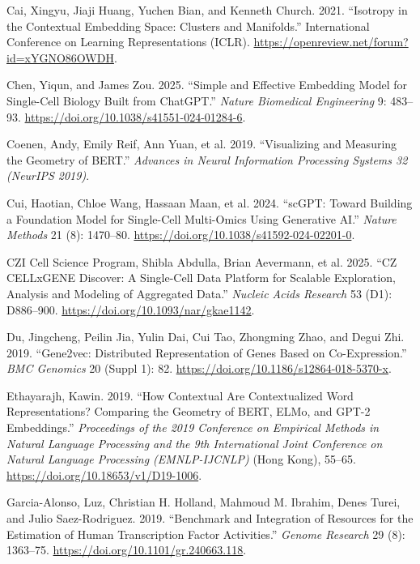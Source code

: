 \documentclass[
  11pt,
]{article}
\newlength{\cslhangindent}
\newenvironment{CSLReferences}[2] %
 {\begin{list}{}{%
  \setlength{\itemindent}{0pt}
  \setlength{\leftmargin}{0pt}
  \setlength{\parsep}{0pt}
  \ifodd #1
   \setlength{\leftmargin}{\cslhangindent}
   \setlength{\itemindent}{-1\cslhangindent}
  \fi
  \setlength{\itemsep}{#2\baselineskip}}}
 {\end{list}}
\begin{document}
\begin{CSLReferences}{1}{1}
Cai, Xingyu, Jiaji Huang, Yuchen Bian, and Kenneth Church. 2021.
{``Isotropy in the Contextual Embedding Space: Clusters and
Manifolds.''} International Conference on Learning Representations
(ICLR). \url{https://openreview.net/forum?id=xYGNO86OWDH}.

Chen, Yiqun, and James Zou. 2025. {``Simple and Effective Embedding
Model for Single-Cell Biology Built from {ChatGPT}.''} \emph{Nature
Biomedical Engineering} 9: 483--93.
\url{https://doi.org/10.1038/s41551-024-01284-6}.

Coenen, Andy, Emily Reif, Ann Yuan, et al. 2019. {``Visualizing and
Measuring the Geometry of {BERT}.''} \emph{{Advances in Neural
Information Processing Systems 32 (NeurIPS 2019)}}.

Cui, Haotian, Chloe Wang, Hassaan Maan, et al. 2024. {``{scGPT}: Toward
Building a Foundation Model for Single-Cell Multi-Omics Using Generative
{AI}.''} \emph{Nature Methods} 21 (8): 1470--80.
\url{https://doi.org/10.1038/s41592-024-02201-0}.

{CZI Cell Science Program, Shibla Abdulla, Brian Aevermann, et al.}
2025. {``{CZ CELLxGENE Discover}: A Single-Cell Data Platform for
Scalable Exploration, Analysis and Modeling of Aggregated Data.''}
\emph{Nucleic Acids Research} 53 (D1): D886--900.
\url{https://doi.org/10.1093/nar/gkae1142}.

Du, Jingcheng, Peilin Jia, Yulin Dai, Cui Tao, Zhongming Zhao, and Degui
Zhi. 2019. {``{Gene2vec}: Distributed Representation of Genes Based on
Co-Expression.''} \emph{BMC Genomics} 20 (Suppl 1): 82.
\url{https://doi.org/10.1186/s12864-018-5370-x}.

Ethayarajh, Kawin. 2019. {``How Contextual Are Contextualized Word
Representations? {Comparing} the Geometry of {BERT}, {ELMo}, and {GPT-2}
Embeddings.''} \emph{{Proceedings of the 2019 Conference on Empirical
Methods in Natural Language Processing and the 9th International Joint
Conference on Natural Language Processing (EMNLP-IJCNLP)}} (Hong Kong),
55--65. \url{https://doi.org/10.18653/v1/D19-1006}.

Garcia-Alonso, Luz, Christian H. Holland, Mahmoud M. Ibrahim, Denes
Turei, and Julio Saez-Rodriguez. 2019. {``Benchmark and Integration of
Resources for the Estimation of Human Transcription Factor
Activities.''} \emph{Genome Research} 29 (8): 1363--75.
\url{https://doi.org/10.1101/gr.240663.118}.


\end{CSLReferences}
\end{document}
